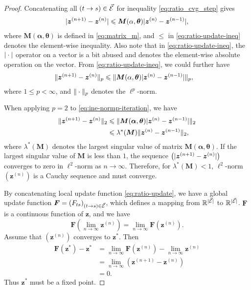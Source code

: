\begin{proof}
  
  Concatenating all $(t\rightarrow s) \in \vec{\mathcal{E}}$ for inequality \eqref{eq:ratio_cvg_step} gives
  \begin{equation}\label{eq:ratio-update-ineq}
    | \bm{z}^{(n+1)} - \bm{z}^{(n)} | \leqslant \bm{M}(\alpha, \bm{\theta})| \bm{z}^{(n)} - \bm{z}^{(n-1)} |,
  \end{equation}
  where $\bm{M}(\bm{\alpha}, \bm{\theta})$ is defined in \eqref{eq:matrix_m}, and $\leq$ in \eqref{eq:ratio-update-ineq} denotes the element-wise inequality. Also note that in \eqref{eq:ratio-update-ineq}, the $| \cdot |$ operator on a vector is a bit abused and denotes the element-wise absolute operation on the vector. From \eqref{eq:ratio-update-ineq}, we could further have
  \begin{align}\label{eq:ine-normp-iteration}
    \| \bm{z}^{(n+1)} - \bm{z}^{(n)} \|_{p} &\leqslant \| \bm{M}(\alpha, \bm{\theta})| \bm{z}^{(n)} - \bm{z}^{(n-1)} | \|_{p},               
  \end{align}
  where $1\leq p < \infty$, and $\| \cdot \|_p$ denotes the ${\ell}^p$-norm.

  When applying $p=2$ to \eqref{eq:ine-normp-iteration}, we have
  \begin{align}\label{eq:ieq-largest-singular}
    \| \bm{z}^{(n+1)} - \bm{z}^{(n)} \|_{2} &\leqslant \| \bm{M}(\bm{\alpha}, \bm{\theta})| \bm{z}^{(n)} - \bm{z}^{(n-1)} | \|_{2} \nonumber \\
                                          &\leqslant \lambda^{\ast}(\bm{M})\| \bm{z}^{(n)} - \bm{z}^{(n-1)} \|_{2},
  \end{align}
  where $\lambda^{\ast}(\bm{M})$ denotes the largest singular value of matrix
  $\bm{M}(\bm{\alpha}, \bm{\theta})$. If the largest singular value of $\bm{M}$ is less than $1$, the sequence
  $\left( | \bm{z}^{(n+1)} - \bm{z}^{(n)} |\right)$ converges to zero in $\ell^2$-norm as $n \rightarrow \infty$. Therefore, for $\lambda^{\ast}(\bm{M})<1$, $\ell^2$-norm $\left(  \bm{z}^{(n)}  \right)$ is a Cauchy sequence and must converge. 

  By concatenating local update function \eqref{eq:ratio-update}, we have a global update function $\bm{F} = \left(  F_{ts}  \right)_{ (t \rightarrow s) \in \vec{\mathcal{E}}}$, which defines a mapping from $\mathbb{R}^{| \vec{\mathcal{E}} |}$ to $\mathbb{R}^{| \vec{\mathcal{E}} |}$. $\bm{F}$ is a continuous function of $\bm{z}$, and we have
  \begin{equation}
    \bm{F}(\lim_{n\rightarrow \infty}\bm{z}^{(n)}) = \lim_{n\rightarrow \infty}\bm{F}(\bm{z}^{(n)}).
  \end{equation}
  Assume that $\left(  \bm{z}^{(n)} \right)$ converges to
  $\bm{z}^{\ast}$. Then
  \begin{align}
    \bm{F}(\bm{z}^{\ast}) - \bm{z}^{\ast}
    &= \lim_{n\rightarrow \infty} \bm{F}(\bm{z}^{(n)}) -\lim_{n\rightarrow
      \infty} \bm{z}^{(n)} \nonumber \\
    &= \lim_{n\rightarrow \infty} (\bm{z}^{(n+1)} - \bm{z}^{(n)}) \nonumber \\
    &= 0.
  \end{align}
  Thus $\bm{z}^{\ast}$ must be a fixed point.


\end{proof}
